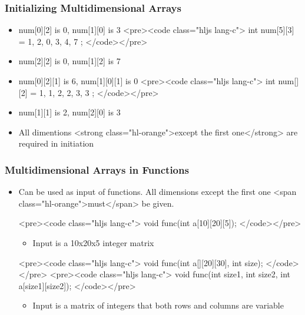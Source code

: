 \documentclass{../c-lecture}
\begin{document}
\begin{frame}
  \begin{frame}
    \frametitle{Initializing Multidimensional Arrays}
    \begin{itemize}
      <pre><code class="hljs lang-c">
int num[2][3] = {1, 2, 0, 3, 4, 7};
int num[2][3] = { {1, 2, 0}, {3, 4, 7} };
      </code></pre>
      \item num[0][2] is 0, num[1][0] is 3
      <pre><code class="hljs lang-c">
int num[5][3] = { {1, 2, 0}, {3, 4, 7} };
      </code></pre>
      \item num[2][2] is 0, num[1][2] is 7
    \end{itemize}
  \end{frame}
  \begin{frame}
    \begin{itemize}
      <pre><code class="hljs lang-c">
int num[2][3][2] = { { {1, 2}, {3, 4}, {5, 6} }, { {1}, {2}, {3} } };
      </code></pre>
      \item num[0][2][1] is 6, num[1][0][1] is 0
      <pre><code class="hljs lang-c">
int num[][2] = { {1, 1}, {2, 2}, {3, 3} };
      </code></pre>
      \item num[1][1] is 2, num[2][0] is 3
      \item
        All dimentions
        <strong class="hl-orange">except the first one</strong> are required in
        initiation

    \end{itemize}
  \end{frame}
\end{frame}
\begin{frame}
  \frametitle{Multidimensional Arrays in Functions}
  \begin{itemize}
    \item
      Can be used as input of functions. All dimensions except the first one
      <span class="hl-orange">must</span> be given.

    <pre><code class="hljs lang-c">
void func(int a[10][20][5]);
    </code></pre>
    \begin{itemize}
      \item Input is a 10x20x5 integer matrix
    \end{itemize}
    <pre><code class="hljs lang-c">
void func(int a[][20][30], int size);
    </code></pre>
    <pre><code class="hljs lang-c">
void func(int size1, int size2, int a[size1][size2]);
    </code></pre>
    \begin{itemize}
      \item
        Input is a matrix of integers that both rows and columns are variable

    \end{itemize}
  \end{itemize}
\end{frame}
\end{document}
